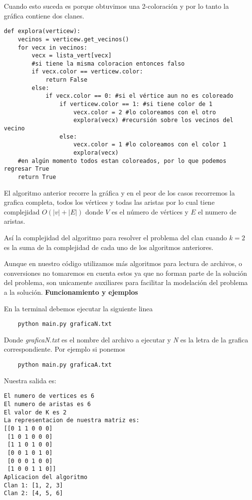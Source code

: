 \documentclass[12pt,letterpaper]{article}
\begin{document}
Cuando esto suceda es porque obtuvimos una 2-coloración y por lo tanto la gráfica contiene dos clanes.

\begin{verbatim}
def explora(verticew):
    vecinos = verticew.get_vecinos()
    for vecx in vecinos:
        vecx = lista_vert[vecx]
        #si tiene la misma coloracion entonces falso
        if vecx.color == verticew.color: 
            return False
        else:
            if vecx.color == 0: #si el vértice aun no es coloreado
                if verticew.color == 1: #si tiene color de 1
                    vecx.color = 2 #lo coloreamos con el otro
                    explora(vecx) #recursión sobre los vecinos del vecino
                else:
                    vecx.color = 1 #lo coloreamos con el color 1
                    explora(vecx)
    #en algún momento todos estan coloreados, por lo que podemos regresar True
    return True 
\end{verbatim}

El algoritmo anterior recorre la gráfica y en el peor de los casos recorremos la grafica completa, todos los vértices y todas las aristas por lo cual tiene complejidad $O(|v|+|E|)$ donde $V$ es el número de vértices y $E$ el numero de aristas.

Así la complejidad del algoritmo para resolver el problema del clan cuando $k=2$ es la suma de la complejidad de cada uno de los algoritmos anteriores.

Aunque en nuestro código utilizamos más algoritmos para lectura de archivos, o conversiones no tomaremos en cuenta estos ya que no forman parte de la solución del problema, son unicamente auxiliares para facilitar la modelación del problema a la solución.
\newpage
\textbf{Funcionamiento y ejemplos}

En la terminal debemos ejecutar la siguiente linea
\begin{verbatim}
    python main.py graficaN.txt
\end{verbatim}

Donde \textit{graficaN.txt} es el nombre del archivo a ejecutar y \textit{N} es la letra de la grafica correspondiente. Por ejemplo si ponemos

\begin{verbatim}
    python main.py graficaA.txt
\end{verbatim}

Nuestra salida es:
\begin{verbatim}
El numero de vertices es 6
El numero de aristas es 6
El valor de K es 2
La representacion de nuestra matriz es:
[[0 1 1 0 0 0]
 [1 0 1 0 0 0]
 [1 1 0 1 0 0]
 [0 0 1 0 1 0]
 [0 0 0 1 0 0]
 [1 0 0 1 1 0]]
Aplicacion del algoritmo
Clan 1: [1, 2, 3]
Clan 2: [4, 5, 6]
\end{verbatim}
\end{document}
